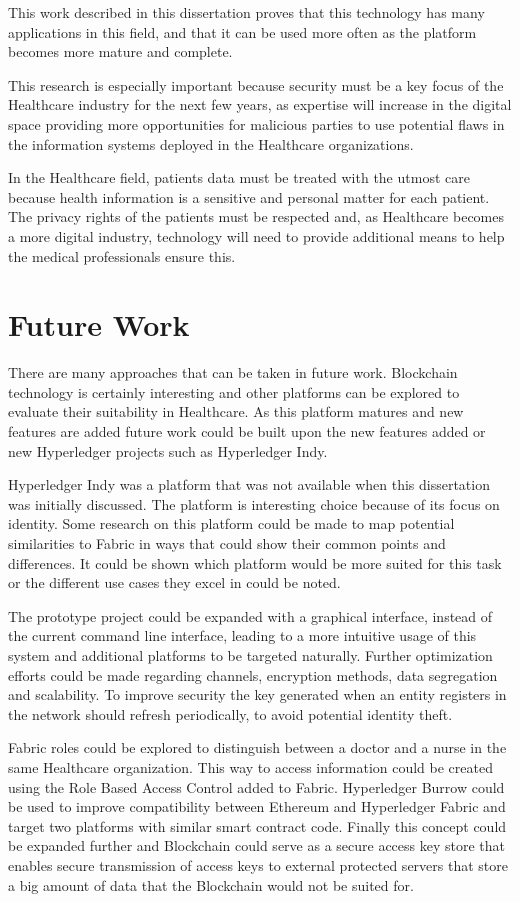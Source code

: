 This work described in this dissertation proves that this technology has many
applications in this field, and that it can be used more often as the platform
becomes more mature and complete.

This research is especially important because security must be a key focus of
the Healthcare industry for the next few years, as expertise will increase in
the digital space providing more opportunities for malicious parties to use
potential flaws in the information systems deployed in the Healthcare
organizations.

In the Healthcare field, patients data must be treated with the utmost care
because health information is a sensitive and personal matter for each patient.
The privacy rights of the patients must be respected and, as Healthcare becomes
a more digital industry, technology will need to provide additional means to
help the medical professionals ensure this.

\section{Future Work} \label{futureWork}

There are many approaches that can be taken in future work. Blockchain
technology is certainly interesting and other platforms can be explored to
evaluate their suitability in Healthcare. As this platform matures and new
features are added future work could be built upon the new features added or
new Hyperledger projects such as Hyperledger Indy. 

Hyperledger Indy was a platform that was not available when this dissertation
was initially discussed. The platform is interesting choice because of its
focus on identity. Some research on this platform could be made to map
potential similarities to Fabric in ways that could show their common points
and differences. It could be shown which platform would be more suited for this
task or the different use cases they excel in could be noted.

The prototype project could be expanded with a graphical interface, instead of
the current command line interface, leading to a more intuitive usage of this
system and additional platforms to be targeted naturally. Further optimization
efforts could be made regarding channels, encryption methods, data segregation
and scalability. To improve security the key generated when an entity registers
in the network should refresh periodically, to avoid potential identity theft.

Fabric roles could be explored to distinguish between a doctor and a nurse in
the same Healthcare organization.  This way to access information could be
created using the Role Based Access Control added to Fabric.  Hyperledger
Burrow could be used to improve compatibility between Ethereum and Hyperledger
Fabric and target two platforms with similar smart contract code.  Finally this
concept could be expanded further and Blockchain could serve as a secure access
key store that enables secure transmission of access keys to external protected
servers that store a big amount of data that the Blockchain would not be suited
for.
